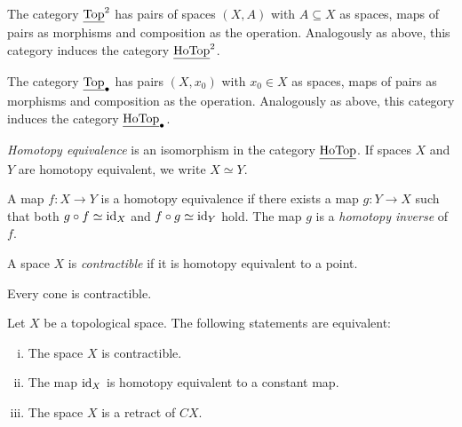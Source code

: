 \begin{definicija}
The category $\underline{\operatorname{Top}}^2$ has pairs of spaces $(X, A)$ with
$A \subseteq X$ as spaces, maps of pairs as morphisms and
composition as the operation. Analogously as above, this category
induces the category $\underline{\operatorname{HoTop}}^2$.
\end{definicija}

\begin{definicija}
The category $\underline{\operatorname{Top}}_\bullet$ has pairs $(X, x_0)$ with
$x_0 \in X$ as spaces, maps of pairs as morphisms and composition
as the operation. Analogously as above, this category induces the
category $\underline{\operatorname{HoTop}}_\bullet$.
\end{definicija}

\begin{definicija}
\emph{Homotopy equivalence} is an
isomorphism in the category $\underline{\operatorname{HoTop}}$. If spaces $X$ and $Y$
are homotopy equivalent, we write $X \simeq Y$.
\end{definicija}

\begin{opomba}
A map $f \colon X \to Y$ is a homotopy equivalence if there exists
a map $g \colon Y \to X$ such that both $g \circ f \simeq \operatorname{id}_X$
and $f \circ g \simeq \operatorname{id}_Y$ hold. The map $g$ is a
\emph{homotopy inverse} of $f$.
\end{opomba}

\begin{definicija}
A space $X$ is \emph{contractible} if
it is homotopy equivalent to a point.
\end{definicija}

\begin{opomba}
Every cone is contractible.
\end{opomba}

\begin{trditev}
Let $X$ be a topological space. The following statements are
equivalent:

\begin{enumerate}[i)]
\item The space $X$ is contractible.
\item The map $\operatorname{id}_X$ is homotopy equivalent to a constant map.
\item The space $X$ is a retract of $CX$.
\end{enumerate}
\end{trditev}

\obvs

